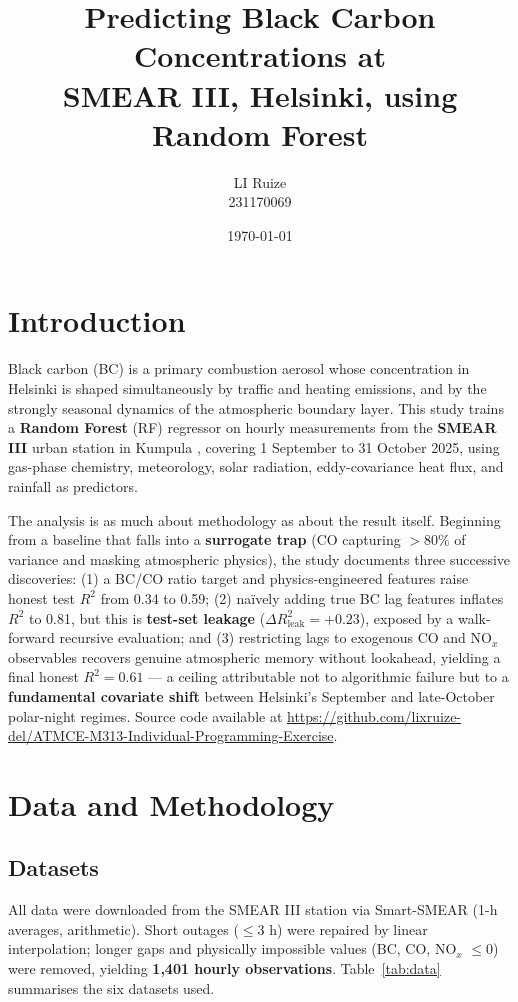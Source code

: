 \documentclass[11pt, a4paper]{article}
\title{\textbf{Predicting Black Carbon Concentrations at\\
SMEAR III, Helsinki, using Random Forest}}
\author{LI Ruize \\ 231170069}
\date{\today}
\begin{document}
\maketitle
\vspace{-10pt}

\section{Introduction}
  Black carbon (BC) is a primary combustion aerosol whose concentration in Helsinki is 
shaped simultaneously by traffic and heating emissions, and by the strongly seasonal
dynamics of the atmospheric boundary layer. This study trains a \textbf{Random Forest} (RF)
regressor \cite{james2023} on hourly measurements from the \textbf{SMEAR III} urban station
in Kumpula \cite{junninen2009}, covering 1 September to 31 October 2025, using gas-phase
chemistry, meteorology, solar radiation, eddy-covariance heat flux, and rainfall as predictors.

The analysis is as much about methodology as about the result itself. Beginning from a
baseline that falls into a \textbf{surrogate trap} (CO capturing $>80\%$ of variance and masking
atmospheric physics), the study documents three successive discoveries: (1) a BC/CO ratio
target and physics-engineered features raise honest test $R^2$ from 0.34 to 0.59; (2) na\"ively
adding true BC lag features inflates $R^2$ to 0.81, but this is \textbf{test-set leakage}
($\Delta R^2_{\mathrm{leak}} = +0.23$), exposed by a walk-forward recursive evaluation; and
(3) restricting lags to exogenous CO and NO$_x$ observables recovers genuine atmospheric
memory without lookahead, yielding a final honest $R^2 = 0.61$ — a ceiling attributable not
to algorithmic failure but to a \textbf{fundamental covariate shift} between Helsinki's September
and late-October polar-night regimes. Source code available at \href{<https://github.com/lixruize-del/ATMCE-M313-Individual-Programming-Exercise>}{https://github.com/lixruize-del/ATMCE-M313-Individual-Programming-Exercise}.

\section{Data and Methodology}

\subsection{Datasets}

All data were downloaded from the SMEAR III station via Smart-SMEAR \cite{junninen2009}
(1-h averages, arithmetic). Short outages ($\leq 3$ h) were repaired by linear interpolation;
longer gaps and physically impossible values (BC, CO, NO$_x$ $\leq 0$) were removed,
yielding \textbf{1,401 hourly observations}. Table~\ref{tab:data} summarises the six datasets used.
\end{document}
